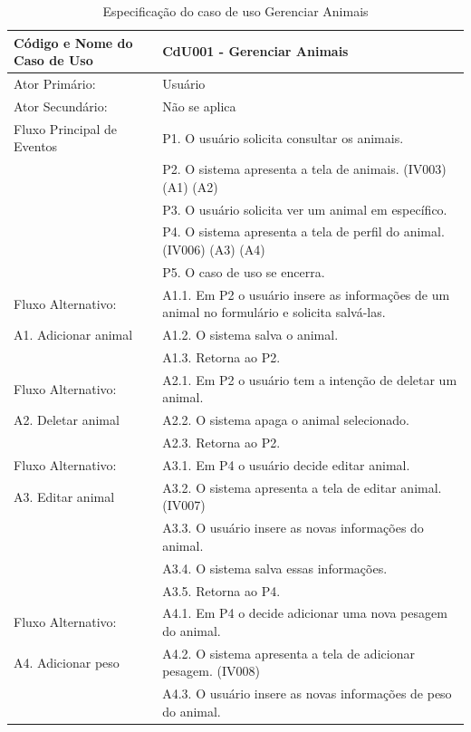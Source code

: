 \documentclass[12pt]{article}
\begin{document}
\begin{titlepage}
\begin{center}
\begin{table}[!h]
	\begin{center}
		\caption{Especificação do caso de uso Gerenciar Animais}
		\begin{tabular}{ | l |  p{10cm} |}
			\hline
			Código e Nome do Caso de Uso & CdU001 - Gerenciar Animais \\ \hline
			Ator Primário: & Usuário \\ 
			Ator Secundário: & Não se aplica \\ \hline
			Fluxo Principal de Eventos & P1. O usuário solicita consultar os animais. \\
						   & P2. O sistema apresenta a tela de animais. (IV003) (A1) (A2) \\
						   & P3. O usuário solicita ver um animal em específico. \\
						   & P4. O sistema apresenta a tela de perfil do animal. (IV006) (A3) (A4)  \\
						   & P5. O caso de uso se encerra. \\ \hline
			Fluxo Alternativo:         & A1.1. Em P2 o usuário insere as informações de um animal no formulário e solicita salvá-las. \\
			A1. Adicionar animal       & A1.2. O sistema salva o animal. \\ 
						   & A1.3. Retorna ao P2. \\ \hline
			Fluxo Alternativo:         & A2.1. Em P2 o usuário tem a intenção de deletar um animal. \\
			A2. Deletar animal         & A2.2. O sistema apaga o animal selecionado. \\
						   & A2.3. Retorna ao P2. \\ \hline
			Fluxo Alternativo:         & A3.1. Em P4 o usuário decide editar animal. \\
			A3. Editar animal          & A3.2. O sistema apresenta a tela de editar animal. (IV007) \\
						   & A3.3. O usuário insere as novas informações do animal. \\
						   & A3.4. O sistema salva essas informações. \\
						   & A3.5. Retorna ao P4. \\ \hline
			Fluxo Alternativo:         & A4.1. Em P4 o decide adicionar uma nova pesagem do animal. \\
			A4. Adicionar peso         & A4.2. O sistema apresenta a tela de adicionar pesagem. (IV008) \\
						   & A4.3. O usuário insere as novas informações de peso do animal. \\

\end{tabular}
\end{center}
\end{table}
\end{center}
\end{titlepage}
\end{document}
